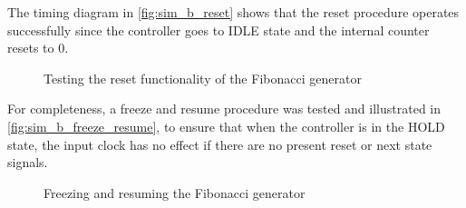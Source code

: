 \documentclass[10pt]{article}
\begin{document}
The timing diagram in \autoref{fig:sim_b_reset} shows that the reset procedure operates successfully since the controller goes to IDLE state and the internal counter resets to 0.
\begin{figure}[ht]
    \centering
    \caption{Testing the reset functionality of the Fibonacci generator}
    \label{fig:sim_b_reset}
\end{figure}
\newpage

For completeness, a freeze and resume procedure was tested and illustrated in \autoref{fig:sim_b_freeze_resume}, to ensure that when the controller is in the HOLD state, the input clock has no effect if there are no present reset or next state signals.

\begin{figure}[ht]
    \centering
    \caption{Freezing and resuming the Fibonacci generator}
    \label{fig:sim_b_freeze_resume}
\end{figure}
\newpage
\end{document}

